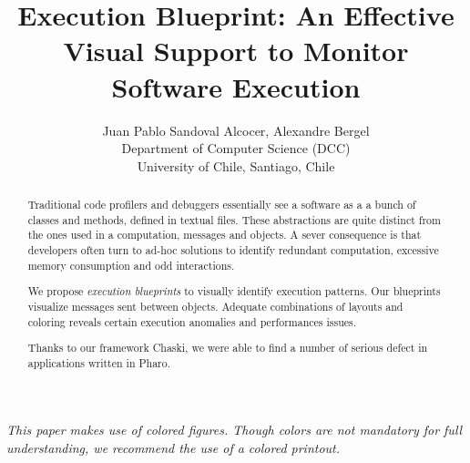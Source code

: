 \documentclass{sig-alternate}
\newcommand{\Title}{Execution Blueprint: An Effective Visual Support to Monitor Software Execution}
\newcommand{\TitleShort}{\Title}
\newcommand{\Authors}{Juan Pablo Sandoval Alcocer, Alexandre Bergel}
\newcommand{\AuthorsShort}{J.P. Sandoval Alcocer, A. Bergel}
\newcommand{\ab}[1]{\nb{Alexandre}{blue}{#1}}
\begin{document}
\title{\Title}

\author{\Authors\\[3mm]
Department of Computer Science (DCC)\\ University of Chile, Santiago, Chile\\[1 ex]
} 

\maketitle

\emph{This paper makes use of colored figures. Though colors are not mandatory for full understanding, we recommend  the use of a colored printout.}



\begin{abstract}

Traditional code profilers and debuggers essentially see a software as a a bunch of classes and methods, defined in textual files. These abstractions are quite distinct from the ones used in a computation, messages and objects. A sever consequence is that developers often turn to ad-hoc solutions to identify redundant computation, excessive memory consumption and odd interactions.  %

We propose \emph{execution blueprints} to visually identify execution patterns. Our blueprints visualize messages sent between objects. Adequate combinations of layouts and coloring reveals certain execution anomalies and performances issues.

Thanks to our framework Chaski, we were able to find a number of serious defect in applications written in Pharo.

%
\end{abstract}
\end{document}
